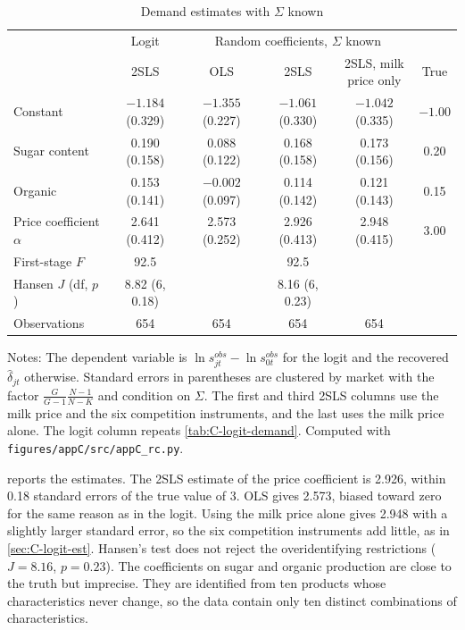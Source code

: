 \begin{table}[htbp]
\centering
\caption{Demand estimates with $\Sigma$ known}
\label{tab:C-rc-demand}
\footnotesize
\setlength{\tabcolsep}{4pt}
\begin{tabular}{@{}lccccc@{}}
\toprule
 & Logit & \multicolumn{3}{c}{Random coefficients, $\Sigma$ known} & \\
\cmidrule(lr){2-2}\cmidrule(lr){3-5}
 & 2SLS & OLS & 2SLS & \makecell{2SLS, milk\\price only} & True \\
\midrule
Constant & $-1.184$ (0.329) & $-1.355$ (0.227) & $-1.061$ (0.330) & $-1.042$ (0.335) & $-1.00$ \\
Sugar content & 0.190 (0.158) & 0.088 (0.122) & 0.168 (0.158) & 0.173 (0.156) & 0.20 \\
Organic & 0.153 (0.141) & $-0.002$ (0.097) & 0.114 (0.142) & 0.121 (0.143) & 0.15 \\
Price coefficient $\alpha$ & 2.641 (0.412) & 2.573 (0.252) & 2.926 (0.413) & 2.948 (0.415) & 3.00 \\
\midrule
First-stage $F$ & 92.5 & & 92.5 & & \\
Hansen $J$ (df, $p$) & 8.82 (6, 0.18) & & 8.16 (6, 0.23) & & \\
Observations & 654 & 654 & 654 & 654 & \\
\bottomrule
\end{tabular}

\vspace{3pt}
\begin{minipage}{0.97\textwidth}
\footnotesize Notes: The dependent variable is $\ln s^{obs}_{jt} - \ln s^{obs}_{0t}$ for the logit and the recovered
$\hat\delta_{jt}$ otherwise. Standard errors in parentheses are clustered by market with the factor
$\frac{G}{G - 1}\frac{N - 1}{N - K}$ and condition on $\Sigma$. The first and third 2SLS columns use the milk price and
the six competition instruments, and the last uses the milk price alone. The logit column repeats \cref{tab:C-logit-demand}. Computed with
\texttt{figures/appC/src/appC\_rc.py}.
\end{minipage}
\end{table}

 reports the estimates. The 2SLS estimate of the price coefficient is 2.926, within 0.18
standard errors of the true value of 3. OLS gives 2.573, biased toward zero for the same reason as in the logit. Using
the milk price alone gives 2.948 with a slightly larger standard error, so the six competition instruments add little,
as in \cref{sec:C-logit-est}. Hansen's test does not reject the overidentifying restrictions ($J = 8.16$, $p = 0.23$).
The coefficients on sugar and organic production are close to the truth but imprecise. They are identified from ten
products whose characteristics never change, so the data contain only ten distinct combinations of characteristics.

